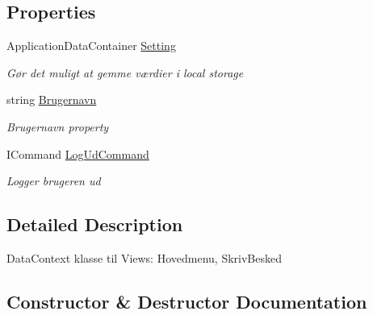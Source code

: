 \subsection*{Properties}
\begin{DoxyCompactItemize}
\item 
Application\+Data\+Container \hyperlink{class__1aarsproeve_1_1_view_model_1_1_hoved_view_model_afbb2eb2f33bdb6defe9979b80c6e79ff}{Setting}
\begin{DoxyCompactList}\small\item\em Gør det muligt at gemme værdier i local storage \end{DoxyCompactList}\item 
string \hyperlink{class__1aarsproeve_1_1_view_model_1_1_hoved_view_model_a48f0c876a1e3cd598fe3c4c7c65a760d}{Brugernavn}
\begin{DoxyCompactList}\small\item\em Brugernavn property \end{DoxyCompactList}\item 
I\+Command \hyperlink{class__1aarsproeve_1_1_view_model_1_1_hoved_view_model_ae541527e8e9063cc3337b229b93c7e48}{Log\+Ud\+Command}
\begin{DoxyCompactList}\small\item\em Logger brugeren ud \end{DoxyCompactList}\end{DoxyCompactItemize}


\subsection{Detailed Description}
Data\+Context klasse til Views\+: Hovedmenu, Skriv\+Besked 



\subsection{Constructor \& Destructor Documentation}
\hypertarget{class__1aarsproeve_1_1_view_model_1_1_hoved_view_model_ad1f93a3cec1e8f3b2272a4e92adb2815}{}
